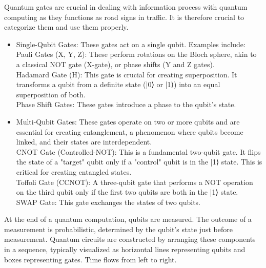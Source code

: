 \documentclass{article}
\begin{document}
Quantum gates are crucial in dealing with information process with quantum computing as they functions as road signs in traffic. It is therefore crucial to categorize them and use them properly.
\begin{itemize}

        \item Single-Qubit Gates: These gates act on a single qubit. Examples include:\\
            Pauli Gates (X, Y, Z): These perform rotations on the Bloch sphere, akin to a classical NOT gate (X-gate), or phase shifts (Y and Z gates).\\
            Hadamard Gate (H): This gate is crucial for creating superposition. It transforms a qubit from a definite state (|0⟩ or |1⟩) into an equal superposition of both.\\
            Phase Shift Gates: These gates introduce a phase to the qubit's state.

        \item Multi-Qubit Gates: These gates operate on two or more qubits and are essential for creating entanglement, a phenomenon where qubits become linked, and their states are interdependent.\\
            CNOT Gate (Controlled-NOT): This is a fundamental two-qubit gate. It flips the state of a "target" qubit only if a "control" qubit is in the |1⟩ state. This is critical for creating entangled states.\\
            Toffoli Gate (CCNOT): A three-qubit gate that performs a NOT operation on the third qubit only if the first two qubits are both in the |1⟩ state.\\
            SWAP Gate: This gate exchanges the states of two qubits.
\end{itemize}
 At the end of a quantum computation, qubits are measured. The outcome of a measurement is probabilistic, determined by the qubit's state just before measurement. Quantum circuits are constructed by arranging these components in a sequence, typically visualized as horizontal lines representing qubits and boxes representing gates. Time flows from left to right.\\
\end{document}

